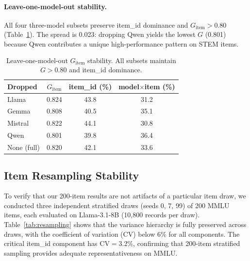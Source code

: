 \documentclass[11pt,a4paper]{article}
\newcommand{\Gcoeff}{\ensuremath{G}}
\begin{document}
\paragraph{Leave-one-model-out stability.}
All four three-model subsets preserve item\_id dominance and $\Gcoeff_\text{item}>0.80$ (Table~\ref{tab:lomo}).
The spread is 0.023: dropping Qwen yields the lowest $\Gcoeff$ (0.801) because Qwen contributes a unique high-performance pattern on STEM items.

\begin{table}[t]
\centering
\caption{Leave-one-model-out $\Gcoeff_\text{item}$ stability. All subsets maintain $\Gcoeff>0.80$ and item\_id dominance.}
\label{tab:lomo}
\small
\begin{tabular}{lccc}
\toprule
\textbf{Dropped} & \textbf{$\Gcoeff_\text{item}$} & \textbf{item\_id (\%)} & \textbf{model$\times$item (\%)} \\
\midrule
Llama   & 0.824 & 43.8 & 31.2 \\
Gemma   & 0.808 & 40.5 & 35.1 \\
Mistral & 0.822 & 44.1 & 30.8 \\
Qwen    & 0.801 & 39.8 & 36.4 \\
None (full) & 0.820 & 42.1 & 33.6 \\
\bottomrule
\end{tabular}
\end{table}

\subsection{Item Resampling Stability}
\label{sec:resampling}

To verify that our 200-item results are not artifacts of a particular item draw, we conducted three independent stratified draws (seeds 0, 7, 99) of 200 MMLU items, each evaluated on Llama-3.1-8B (10,800 records per draw).
Table~\ref{tab:resampling} shows that the variance hierarchy is fully preserved across draws, with the coefficient of variation (CV) below 6\% for all components.
The critical item\_id component has CV$=$3.2\%, confirming that 200-item stratified sampling provides adequate representativeness on MMLU.
\end{document}
